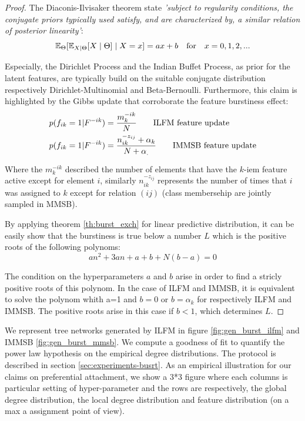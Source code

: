 \begin{proof}
The Diaconis-Ilvisaker theorem \cite{diaconis1979conjugate} state \emph{'subject to regularity conditions, the conjugate priors typically used satisfy, and are characterized by, a  similar relation of posterior linearity'}:
\begin{equation}
\mathbb{E}_\Theta[\mathbb{E}_{X|\Theta}[X\mid \Theta] \mid X=x] = ax+b \quad \textnormal{for} \quad x=0,1,2,... \nonumber
\end{equation}

Especially, the Dirichlet Process and the Indian Buffet Process, as prior for the latent features, are typically build on the suitable conjugate distribution respectively Dirichlet-Multinomial and Beta-Bernoulli. Furthermore, this claim is highlighted by the Gibbs update that corroborate the feature burstiness effect:
\begin{align} \label{eq:feat_up}
&\p(f_{ik} = 1 | F^{-ik}) = \frac{m_k^{-ik}}{N} \qquad \text{ILFM feature update} \nonumber \\
&\p(f_{ik} = 1 | F^{-ik}) = \frac{n_{ik}^{-z_{ij}}+\alpha_k}{N+\alpha_.} \qquad \text{IMMSB feature update} \nonumber \\
\end{align}

Where the $m_k^{-ik}$ described the number of elements that have the $k$-iem feature active except for element $i$, similarly $n_{ik}^{-z_{ij}}$ represents the number of times that $i$ was assigned to $k$ except for relation $(ij)$ (class membersehip are jointly sampled in MMSB).

By applying theorem \ref{th:burst_exch} for linear predictive distribution, it can be easily show that the burstiness is true below a number $L$ which is the positive roots of the following polynoms:
\begin{equation}
	 an^2 + 3an + a + b + N(b-a) = 0
\end{equation}

The condition on the hyperparameters $a$ and $b$ arise in order to find a stricly positive roots of this polynom. In the case of ILFM and IMMSB, it is equivalent to solve the polynom whith a=1 and  $b=0$ or $b=\alpha_k$ for respectively ILFM and IMMSB. The positive roots arise in this case if $b < 1$, which determines $L$.
\end{proof}

We represent tree networks generated by ILFM in figure \ref{fig:gen_burst_ilfm} and IMMSB \ref{fig:gen_burst_mmsb}. We compute a goodness of fit to quantify the power law hypothesis on the empirical degree distributions. The protocol is described in section \ref{sec:experiments-busrt}. As an empirical illustration for our claims on preferential attachment, we show a 3*3 figure where each columns is particular setting of hyper-parameter and the rows are respectively, the global degree distribution, the local degree distribution and feature distribution (on a max a assignment point of view).

